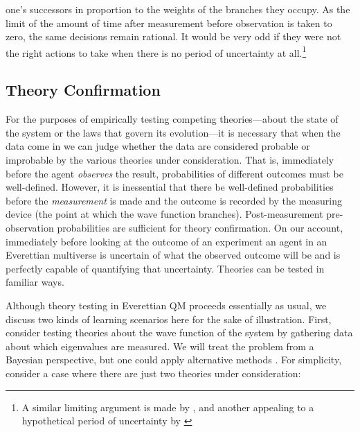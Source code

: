 \documentclass[12pt,onecolumn,secnumarabic,amsmath,amssymb,balancelastpage,nofootinbib]{article}
\begin{document}
one's successors in proportion to the weights of the branches they occupy.  As the limit of the amount of time after measurement before observation is taken to zero, the same decisions remain rational.  It would be very odd if they were not the right actions to take when there is no period of uncertainty at all.\footnote{A similar limiting argument is made by \citet[.1]{greaves2007b}, and another {appealing to} a hypothetical period of uncertainty by \citet[][]{tappenden2011}}

\subsection{Theory Confirmation}\label{inflink}

For the purposes of empirically testing competing theories---about the state of the system or the laws that govern its evolution---it is necessary that when the data come in we can judge whether the data are considered probable or improbable by the various theories under consideration.  That is, immediately before the agent \emph{observes} the result, probabilities of different outcomes must be well-defined.  However, it is inessential that there be well-defined probabilities before the \emph{measurement} is made and the outcome is recorded by the measuring device (the point at which the wave function branches).  Post-measurement pre-observation probabilities are sufficient for theory confirmation.  On our account, immediately before looking at the outcome of an experiment an agent in an Everettian multiverse is uncertain of what the observed outcome will be and is perfectly capable of quantifying that uncertainty.  Theories can be tested in familiar ways.

Although theory testing in Everettian QM proceeds essentially as usual, we discuss two kinds of learning scenarios here for the sake of illustration. First, consider testing theories about the wave function of the system by gathering data about which eigenvalues are measured.  We will treat the problem from a Bayesian perspective, but one could {apply alternative} methods \citep[see][ \& 6.3]{wallace2012}.  For simplicity, consider a case where there are just two theories under consideration:
\end{document}
